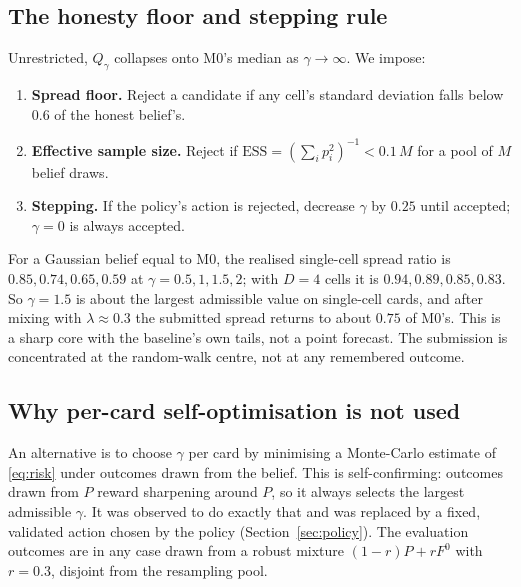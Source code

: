 \subsection{The honesty floor and stepping rule}

Unrestricted, $Q_\gamma$ collapses onto M0's median as $\gamma\to\infty$. We impose:
\begin{enumerate}[leftmargin=*]
\item \textbf{Spread floor.} Reject a candidate if any cell's standard deviation falls below $0.6$ of the honest belief's.
\item \textbf{Effective sample size.} Reject if $\mathrm{ESS}=(\sum_i p_i^2)^{-1}<0.1\,M$ for a pool of $M$ belief draws.
\item \textbf{Stepping.} If the policy's action is rejected, decrease $\gamma$ by $0.25$ until accepted; $\gamma=0$ is always accepted.
\end{enumerate}
For a Gaussian belief equal to M0, the realised single-cell spread ratio is $0.85, 0.74, 0.65, 0.59$ at $\gamma=0.5,1,1.5,2$; with $D=4$ cells it is
$0.94,0.89,0.85,0.83$. So $\gamma=1.5$ is about the largest admissible value on single-cell cards, and after mixing with $\lambda\approx0.3$ the
submitted spread returns to about $0.75$ of M0's. This is a sharp core with the baseline's own tails, not a point forecast. The submission is
concentrated at the random-walk centre, not at any remembered outcome.

\subsection{Why per-card self-optimisation is not used}

An alternative is to choose $\gamma$ per card by minimising a Monte-Carlo estimate of \eqref{eq:risk} under outcomes drawn from the belief. This
is self-confirming: outcomes drawn from $P$ reward sharpening around $P$, so it always selects the largest admissible $\gamma$. It was observed to do
exactly that and was replaced by a fixed, validated action chosen by the policy (Section~\ref{sec:policy}). The evaluation outcomes are in any case
drawn from a robust mixture $(1-r)P+rF^0$ with $r=0.3$, disjoint from the resampling pool.
